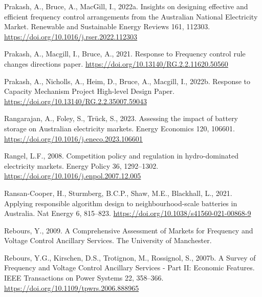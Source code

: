 \documentclass[12pt,a4paper,]{report}
\newlength{\cslhangindent}
\newenvironment{CSLReferences}[2] %
 {%
  \setlength{\parindent}{0pt}
  \ifodd #1 \everypar{\setlength{\hangindent}{\cslhangindent}}\ignorespaces\fi
  \ifnum #2 > 0
  \setlength{\parskip}{#2\baselineskip}
  \fi
 }%
 {}
\begin{document}
\begin{CSLReferences}{1}{0}
\leavevmode{}%
Prakash, A., Bruce, A., MacGill, I., 2022a. Insights on designing
effective and efficient frequency control arrangements from the
{Australian National Electricity Market}. Renewable and Sustainable
Energy Reviews 161, 112303.
\url{https://doi.org/10.1016/j.rser.2022.112303}

\leavevmode{}%
Prakash, A., Macgill, I., Bruce, A., 2021. Response to {Frequency}
control rule changes directions paper.
\url{https://doi.org/10.13140/RG.2.2.11620.50560}

\leavevmode{}%
Prakash, A., Nicholls, A., Heim, D., Bruce, A., Macgill, I., 2022b.
Response to {Capacity Mechanism Project High-level Design Paper}.
\url{https://doi.org/10.13140/RG.2.2.35007.59043}

\leavevmode{}%
Rangarajan, A., Foley, S., Trück, S., 2023. Assessing the impact of
battery storage on {Australian} electricity markets. Energy Economics
120, 106601. \url{https://doi.org/10.1016/j.eneco.2023.106601}

\leavevmode{}%
Rangel, L.F., 2008. Competition policy and regulation in hydro-dominated
electricity markets. Energy Policy 36, 1292--1302.
\url{https://doi.org/10.1016/j.enpol.2007.12.005}

\leavevmode{}%
Ransan-Cooper, H., Sturmberg, B.C.P., Shaw, M.E., Blackhall, L., 2021.
Applying responsible algorithm design to neighbourhood-scale batteries
in {Australia}. Nat Energy 6, 815--823.
\url{https://doi.org/10.1038/s41560-021-00868-9}

\leavevmode{}%
Rebours, Y., 2009. A {Comprehensive Assessment} of {Markets} for
{Frequency} and {Voltage Control Ancillary Services}. {The University of
Manchester}.

\leavevmode{}%
Rebours, Y.G., Kirschen, D.S., Trotignon, M., Rossignol, S., 2007b. A
{Survey} of {Frequency} and {Voltage Control Ancillary Services} - {Part
II}: {Economic Features}. IEEE Transactions on Power Systems 22,
358--366. \url{https://doi.org/10.1109/tpwrs.2006.888965}


\end{CSLReferences}
\end{document}
